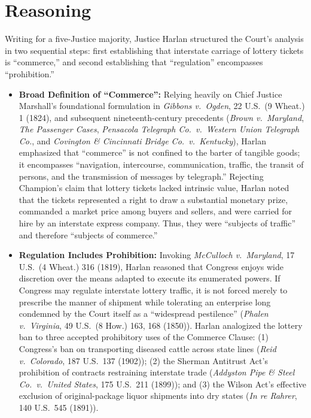 \documentclass[12pt]{article}
\begin{document}
\section{Reasoning}
Writing for a five-Justice majority, Justice Harlan structured the Court's analysis in two sequential steps: first establishing that interstate carriage of lottery tickets is ``commerce,'' and second establishing that ``regulation'' encompasses ``prohibition.''

\begin{itemize}
  \item \textbf{Broad Definition of ``Commerce'':} Relying heavily on Chief Justice Marshall's foundational formulation in \textit{Gibbons v.\ Ogden}, 22 U.S.\ (9 Wheat.) 1 (1824), and subsequent nineteenth-century precedents (\textit{Brown v.\ Maryland}, \textit{The Passenger Cases}, \textit{Pensacola Telegraph Co.\ v.\ Western Union Telegraph Co.}, and \textit{Covington \& Cincinnati Bridge Co.\ v.\ Kentucky}), Harlan emphasized that ``commerce'' is not confined to the barter of tangible goods; it encompasses ``navigation, intercourse, communication, traffic, the transit of persons, and the transmission of messages by telegraph.'' Rejecting Champion's claim that lottery tickets lacked intrinsic value, Harlan noted that the tickets represented a right to draw a substantial monetary prize, commanded a market price among buyers and sellers, and were carried for hire by an interstate express company. Thus, they were ``subjects of traffic'' and therefore ``subjects of commerce.''
  \item \textbf{Regulation Includes Prohibition:} Invoking \textit{McCulloch v.\ Maryland}, 17 U.S.\ (4 Wheat.) 316 (1819), Harlan reasoned that Congress enjoys wide discretion over the means adapted to execute its enumerated powers. If Congress may regulate interstate lottery traffic, it is not forced merely to prescribe the manner of shipment while tolerating an enterprise long condemned by the Court itself as a ``widespread pestilence'' (\textit{Phalen v.\ Virginia}, 49 U.S.\ (8 How.) 163, 168 (1850)). Harlan analogized the lottery ban to three accepted prohibitory uses of the Commerce Clause: (1) Congress's ban on transporting diseased cattle across state lines (\textit{Reid v.\ Colorado}, 187 U.S.\ 137 (1902)); (2) the Sherman Antitrust Act's prohibition of contracts restraining interstate trade (\textit{Addyston Pipe \& Steel Co.\ v.\ United States}, 175 U.S.\ 211 (1899)); and (3) the Wilson Act's effective exclusion of original-package liquor shipments into dry states (\textit{In re Rahrer}, 140 U.S.\ 545 (1891)).

\end{itemize}
\end{document}
